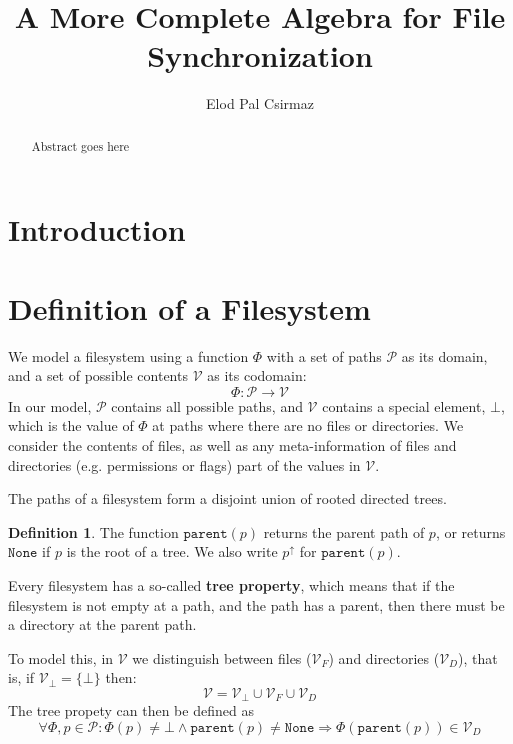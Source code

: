\documentclass[12pt]{article}
\title{A More Complete Algebra for File Synchronization}
\author{Elod Pal Csirmaz}
\newcommand{\setv}{\mathcal{V}}
\newcommand{\setvx}[1]{\mathcal{V}_{#1}}
\newcommand{\setf}{\setvx{F}}
\newcommand{\setd}{\setvx{D}}
\newcommand{\setb}{\setvx{\empt}}
\newcommand{\setp}{\mathcal{P}}
\newcommand{\empt}{\bot}
\newcommand{\parent}{\mathtt{parent}}
\newcommand{\toppath}{\mathtt{None}}
\newcommand{\FS}{\Phi} %
\newcommand{\pp}{p^\uparrow} %
\theoremstyle{definition}
\newtheorem{mydef}{Definition}
\begin{document}
\maketitle
\begin{abstract}
Abstract goes here
\end{abstract}

\section{Introduction}


\section{Definition of a Filesystem}

We model a filesystem using a function $\FS$ with a set of paths $\setp$ as its domain,
and a set of possible contents $\setv$ as its codomain:
\[ \FS : \setp \rightarrow \setv \] 
In our model, $\setp$ contains all possible paths, and $\setv$ contains a special
element, $\empt$, which is the value of $\FS$ at paths where there are no files
or directories.
We consider the contents of files, as well as any meta-information of files
and directories (e.g. permissions or flags) part of the values in $\setv$.

The paths of a filesystem form a disjoint union of rooted directed trees.
\begin{mydef}
The function $\parent(p)$ returns the parent path of $p$, or
returns $\toppath$ if $p$ is the root of a tree.
We also write $\pp$ for $\parent(p)$.
\end{mydef}

Every filesystem has a so-called \textbf{tree property}, which means that
if the filesystem is not empty at a path, and the path has a parent,
then there must be a directory at the parent path.

To model this, in $\setv$ we distinguish between files ($\setf$) and directories ($\setd$), that is,
if $\setb = \{\empt\}$ then:
\[ \setv = \setb \cup \setf \cup \setd \]
The tree propety can then be defined as
\[ \forall \FS, p\in\setp : \FS(p) \neq \empt \wedge \parent(p) \neq \toppath \Rightarrow \FS(\parent(p)) \in \setd \]
\end{document}
